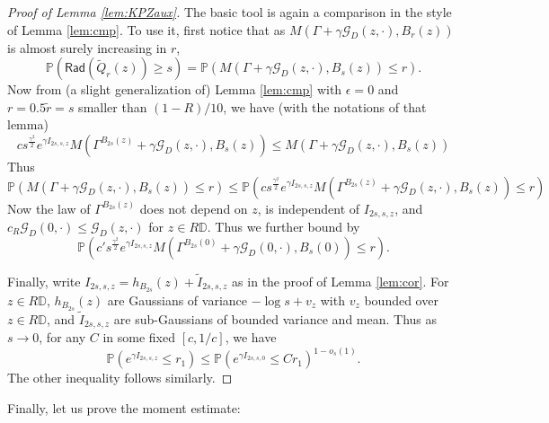 \documentclass[11pt]{amsart}
\newcommand{\G}{\mathcal G}
\newcommand{\D}{\mathbb D}
\renewcommand{\P}{\mathbb P}
\renewcommand{\1}{\mathbf 1}
\newcommand{\eps}{\epsilon}
\newcommand{\radS}{\mathsf{Rad}}
\begin{document}
\begin{proof}[Proof of Lemma \ref{lem:KPZaux}] The basic tool is again a comparison in the style of Lemma \ref{lem:cmp}. To use it, first notice that as $M(\Gamma + \gamma \G_D(z,\cdot), B_r(z))$ is almost surely increasing in $r$,  
$$\P\left(\radS(\tilde Q_r(z)) \geq s\right) = \P\left(M(\Gamma + \gamma \G_D(z,\cdot), B_s(z)) \leq r\right).$$
Now from (a slight generalization of) Lemma \ref{lem:cmp} with $\eps = 0$ and $r = 0.5\tilde r = s$ smaller than $(1-R)/10$, we have (with the notations of that lemma)
$$c s^{\frac{\gamma^2}{2}}e^{\gamma I_{2s,s,z} }M\left(\Gamma^{B_{2s}(z)} + \gamma \G_D(z,\cdot), B_s(z)\right) \leq M\left(\Gamma + \gamma \G_D(z,\cdot), B_s(z)\right)$$
Thus 
$$\P\left(M(\Gamma + \gamma \G_D(z,\cdot), B_s(z)) \leq r\right) \leq \P\left(c s^{\frac{\gamma^2}{2}}e^{\gamma I_{2s,s,z} }M\left(\Gamma^{B_{2s}(z)} + \gamma \G_D(z,\cdot), B_s(z)\right) \leq r\right)$$
Now the law of $\Gamma^{B_{2s}(z)}$ does not depend on $z$, is independent of $I_{2s,s,z}$, and $c_R \G_D(0,\cdot) \leq \G_D(z,\cdot)$ for $z \in R\D$. Thus we further bound by
$$\P\left(c' s^{\frac{\gamma^2}{2}}e^{\gamma I_{2s,s,z} }M\left(\Gamma^{B_{2s}(0)} + \gamma \G_D(0,\cdot), B_s(0)\right) \leq r\right).$$

Finally, write $I_{2s,s,z} = h_{B_{2s}}(z) + \tilde I_{2s,s,z}$ as in the proof of Lemma \ref{lem:cor}. For $z \in R \D$, $h_{B_{2s}}(z)$ are Gaussians of variance $-\log s + v_z$ with $v_z$ bounded over $z \in R \D$, and $\tilde I_{2s,s,z}$ are sub-Gaussians of bounded variance and mean. Thus as $s \to 0$, for any $C$ in some fixed $[c, 1/c]$, we have
$$\P(e^{\gamma I_{2s,s,z} } \leq r_1) \leq \P(e^{\gamma I_{2s,s,0}} \leq Cr_1)^{1-o_s(1)}.$$
The other inequality follows similarly.
\end{proof}

Finally, let us prove the moment estimate:
\end{document}
